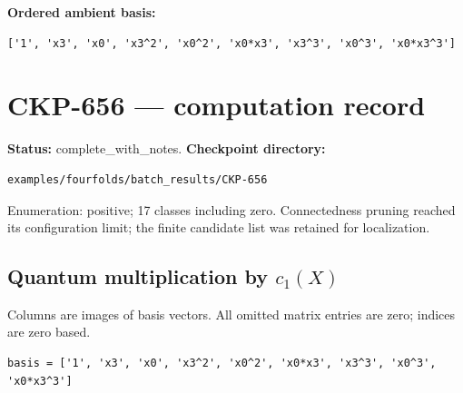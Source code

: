 \documentclass[10pt,a4paper]{article}
\begin{document}
\textbf{Ordered ambient basis:}
\begin{lstlisting}
['1', 'x3', 'x0', 'x3^2', 'x0^2', 'x0*x3', 'x3^3', 'x0^3', 'x0*x3^3']
\end{lstlisting}

\clearpage\section*{CKP-656 --- computation record}
\textbf{Status:} complete\_with\_notes.
\textbf{Checkpoint directory:}
\begin{lstlisting}
examples/fourfolds/batch_results/CKP-656
\end{lstlisting}

Enumeration: positive; 17 classes including zero.
Connectedness pruning reached its configuration limit; the finite candidate list was retained for localization.
\subsection*{Quantum multiplication by $c_1(X)$}
Columns are images of basis vectors. All omitted matrix entries are zero; indices are zero based.

\begin{lstlisting}
basis = ['1', 'x3', 'x0', 'x3^2', 'x0^2', 'x0*x3', 'x3^3', 'x0^3', 'x0*x3^3']
\end{lstlisting}
\end{document}
